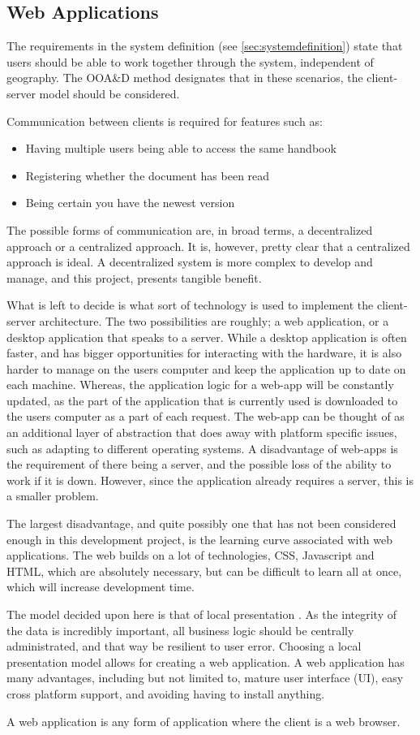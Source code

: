 \subsection{Web Applications}
The requirements in the system definition (see \cref{sec:systemdefinition}) state that users should be able to work together through the system, independent of geography.
The OOA\&D method designates that in these scenarios, the client-server model should be considered. \citep[p.~202]{Rod-Aalborg}

Communication between clients is required for features such as:
\begin{itemize}
\item Having multiple users being able to access the same handbook
\item Registering whether the document has been read
\item Being certain you have the newest version
\end{itemize}

The possible forms of communication are, in broad terms, a decentralized approach or a centralized approach.
It is, however, pretty clear that a centralized approach is ideal.
A decentralized system is more complex to develop and manage, and this project, presents tangible benefit.

What is left to decide is what sort of technology is used to implement the client-server architecture.
The two possibilities are roughly; a web application, or a desktop application that speaks to a server.
While a desktop application is often faster, and has bigger opportunities for interacting with the hardware, it is also harder to manage on the users computer and keep the application up to date on each machine.
Whereas, the application logic for a web-app will be constantly updated, as the part of the application that is currently used is downloaded to the users computer as a part of each request.
The web-app can be thought of as an additional layer of abstraction that does away with platform specific issues, such as adapting to different operating systems.
A disadvantage of web-apps is the requirement of there being a server, and the possible loss of the ability to work if it is down.
However, since the application already requires a server, this is a smaller problem.

The largest disadvantage, and quite possibly one that has not been considered enough in this development project, is the learning curve associated with web applications.
The web builds on a lot of technologies, CSS, Javascript and HTML, which are absolutely necessary, but can be difficult to learn all at once, which will increase development time.

The model decided upon here is that of local presentation \citep[p.~202]{Rod-Aalborg}.
As the integrity of the data is incredibly important, all business logic should be centrally administrated, and that way be resilient to user error.
Choosing a local presentation model allows for creating a web application.
A web application has many advantages, including but not limited to, mature user interface (UI), easy cross platform support, and avoiding having to install anything.

A web application is any form of application where the client is a web browser.
